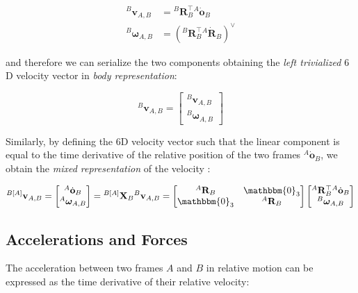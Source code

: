 \begin{align}
    {}^B\bm{v}_{A,B} & = {}^B\mathbf{R}_B^\top {}^A\dot{\mathbf{o}}_B                              \\
    {}^B\boldsymbol{\omega}_{A,B} & = \left({}^B\mathbf{R}_B^\top {}^A\dot{\mathbf{R}}_B \right)^\vee \nonumber
\end{align}

and therefore we can serialize the two components obtaining the \textit{left trivialized} $6$D velocity vector in \textit{body representation}:

\begin{equation}
    \label{eqn:left_trivialized}
    {}^B\mathbf{v}_{A,B} = \begin{bmatrix}
        {}^B\bm{v}_{A,B} \\
        {}^B\boldsymbol{\omega}_{A,B}
    \end{bmatrix}
\end{equation}

Similarly, by defining the $6$D velocity vector such that the linear component is equal to the time derivative of the relative position of the two frames ${}^A\dot{\mathbf{o}}_B$, we obtain the \textit{mixed representation} of the velocity \citep{traversaro_modelling_2019}:

\begin{equation}
    {}^{B[A]}\mathbf{v} _{A,B} =
    \begin{bmatrix}
        {}^A \dot{\mathbf{o}} _B \\
        {}^A \boldsymbol{\omega}_{A,B}
    \end{bmatrix} =
    {}^{B[A]} \mathbf{X}_{B} {}^B\mathbf{v}_{A,B}=
    \begin{bmatrix}
        {}^A \mathbf{R}_B & \mathbbm{0}_3    \\
        \mathbbm{0}_3     & {}^A\mathbf{R}_B
    \end{bmatrix}
    \begin{bmatrix}
        {}^A\mathbf{R}_B ^\top {}^A\dot{\mathbf{o}}_B \\
        {}^B\boldsymbol{\omega}_{A,B}
    \end{bmatrix}
\end{equation}

\subsection{Accelerations and Forces}

The acceleration between two frames $A$ and $B$ in relative motion can be expressed as the time derivative of their relative velocity:

